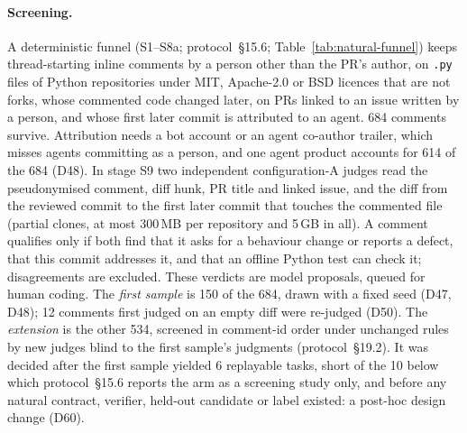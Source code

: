 \paragraph{Screening.} A deterministic funnel (S1--S8a; protocol~\S15.6; Table~\ref{tab:natural-funnel}) keeps thread-starting inline comments by a person other than the PR's author, on \texttt{.py} files of Python repositories under MIT, Apache-2.0 or BSD licences that are not forks, whose commented code changed later, on PRs linked to an issue written by a person, and whose first later commit is attributed to an agent. 684 comments survive. Attribution needs a bot account or an agent co-author trailer, which misses agents committing as a person, and one agent product accounts for 614 of the 684 (D48). In stage S9 two independent configuration-A judges read the pseudonymised comment, diff hunk, PR title and linked issue, and the diff from the reviewed commit to the first later commit that touches the commented file (partial clones, at most 300\,MB per repository and 5\,GB in all). A comment qualifies only if both find that it asks for a behaviour change or reports a defect, that this commit addresses it, and that an offline Python test can check it; disagreements are excluded. These verdicts are model proposals, queued for human coding. The \emph{first sample} is 150 of the 684, drawn with a fixed seed (D47, D48); 12 comments first judged on an empty diff were re-judged (D50). The \emph{extension} is the other 534, screened in comment-id order under unchanged rules by new judges blind to the first sample's judgments (protocol~\S19.2). It was decided after the first sample yielded 6 replayable tasks, short of the 10 below which protocol~\S15.6 reports the arm as a screening study only, and before any natural contract, verifier, held-out candidate or label existed: a post-hoc design change (D60).

